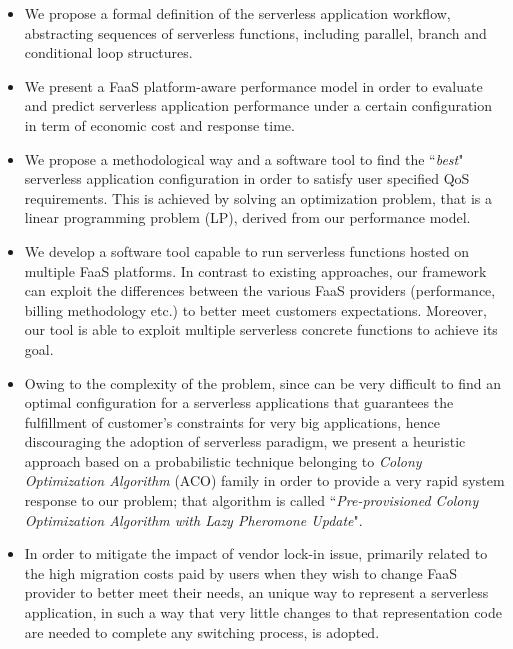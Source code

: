 \documentclass[12pt,a4paper]{report}
\newcommand{\ItalicQuotMark}[1]{``\textit{#1}"}
\begin{document}
\begin{itemize}
	\item We propose a formal definition of the serverless application workflow, abstracting sequences of serverless functions, including parallel, branch and conditional loop structures. 
	
	\item We present a FaaS platform-aware performance model in order to evaluate and predict serverless application performance under a certain configuration in term of economic cost and response time. 
		
	\item We propose a methodological way and a software tool to find the \ItalicQuotMark{best} serverless application configuration in order to satisfy user specified QoS requirements. This is achieved by solving an optimization problem, that is a linear programming problem (LP), derived from our performance model.
		
	\item We develop a software tool capable to run serverless functions hosted on multiple FaaS platforms. In contrast to existing approaches, our framework can exploit the differences between the various FaaS providers (performance, billing methodology etc.) to better meet customers expectations. Moreover, our tool is able to exploit multiple serverless concrete functions to achieve its goal.
	
	\item Owing to the complexity of the problem, since can be very difficult to find an optimal configuration for a serverless applications that guarantees the fulfillment of customer's constraints for very big applications, hence discouraging the adoption of serverless paradigm, we present a heuristic approach based on a probabilistic technique belonging to \textit{Colony Optimization Algorithm} (ACO) family in order to provide a very rapid system response to our problem; that algorithm is called \ItalicQuotMark{Pre-provisioned Colony Optimization Algorithm with Lazy Pheromone Update}.
	
	\item In order to mitigate the impact of vendor lock-in issue, primarily related to the high migration costs paid by users when they wish to change FaaS provider to better meet their needs, an unique way to represent a serverless application, in such a way that very little changes to that representation code are needed to complete any switching process, is adopted. 
	

\end{itemize}
\end{document}
